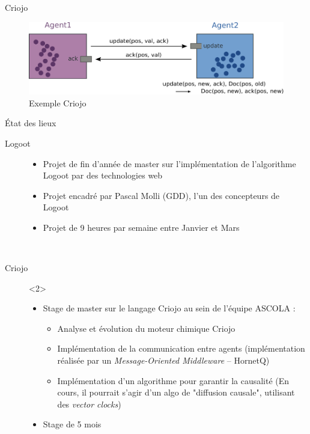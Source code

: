 \begin{frame}{Criojo}
\begin{figure}
  \center
  \includegraphics[width=.9\textwidth]{includes/criojo.pdf}
  \caption{Exemple Criojo}
\end{figure}
\end{frame}

\begin{frame}{État des lieux}
\begin{description}
  \item [Logoot]
  \begin{itemize}
    \item Projet de fin d'année de master sur l'implémentation de l'algorithme
    Logoot par des technologies web
    \item Projet encadré par Pascal Molli (GDD), l'un des concepteurs de Logoot
    \item Projet de 9 heures par semaine entre Janvier et Mars
  \end{itemize}~
  \item [Criojo]<2>
  \begin{itemize} 
    \item Stage de master sur le langage Criojo au sein de l'équipe ASCOLA :
    \begin{itemize} 
      \item Analyse et évolution du moteur chimique Criojo
      \item Implémentation de la communication entre agents (implémentation
      réalisée par un \emph{Message-Oriented Middleware} -- HornetQ)
      \item Implémentation d'un algorithme pour garantir la causalité
      (En cours, il pourrait s'agir d'un algo de "diffusion causale", utilisant
      des \emph{vector clocks}) 
    \end{itemize}
    \item Stage de 5 mois
  \end{itemize}
\end{description}
\end{frame}

